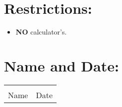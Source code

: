 \documentclass[12pt]{article} %
\begin{document}
	\section{Restrictions:}
  \begin{itemize}
		\item \textbf{NO} calculator's.
  \end{itemize}
	\section{Name and Date:}

  \vspace*{0.1cm}

	\begin{center}
	\noindent\begin{tabular}{ll}
		\makebox[3in]{\hrulefill} & \makebox[3in]{\hrulefill}\\
		Name & Date\\[8ex]%
	\end{tabular}
	\end{center}
	\newpage
\end{document}
